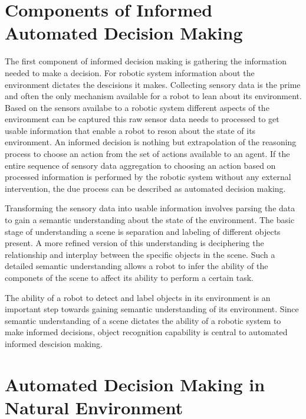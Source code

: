 \documentclass {udthesis}
\begin{document}
\section{Components of Informed Automated Decision Making}

The first component of informed decision making is gathering the information needed to make a decision. For robotic system
information about the environment dictates the descisions it makes. Collecting sensory data is the prime 
and often the only mechanism available for a robot to lean about its environment. Based on the sensors availabe to a 
robotic system different aspects of the environment can be captured this raw sensor data needs to processed
to get usable information that enable a robot to reson about the state of its environment. An informed decision is 
nothing but extrapolation of the reasoning process to choose an action from the set of actions available to an agent.
If the entire sequence of sensory data aggregation to choosing an action based on processed information is performed by
the robotic system without any external intervention, the due process can be described as automated decision making. 

Transforming the sensory data into usable information involves parsing the data to gain a semantic understanding about the state of the environment.
The basic stage of understanding a scene is separation and labeling of different objects present.
A more refined version of this understanding is deciphering the relationship and interplay between the specific objects in the scene.
Such a detailed semantic understanding allows a robot to infer the ability of the componets of the scene to affect its 
ability to perform a certain task.

The ability of a robot to detect and label objects in its environment is an important step towards gaining semantic understanding of its environment.
Since semantic understanding of a scene dictates the ability of a robotic system to make informed decisions, object recognition capability
is central to automated informed descision making.

\section{Automated Decision Making in Natural Environment}
\end{document}
